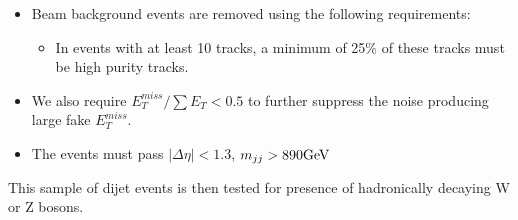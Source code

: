 \begin{itemize}
\begin{itemize}
        \end{itemize}
\item Beam background events are removed using the following requirements:
        \begin{itemize}
        \item In events with at least 10 tracks, a minimum of 25\% of
          these tracks must be high purity tracks.
        \end{itemize}
\item  We also require $E_{T}^{miss}/\sum{E_{T}} < 0.5$ to further suppress the noise producing large fake $E_{T}^{miss}$. 
\item The events must pass $|\Delta\eta|<1.3$, $m_{jj} > 890  \mathrm{GeV}$
\end{itemize}

This sample of dijet events is then tested for presence of
hadronically decaying W or Z bosons.
